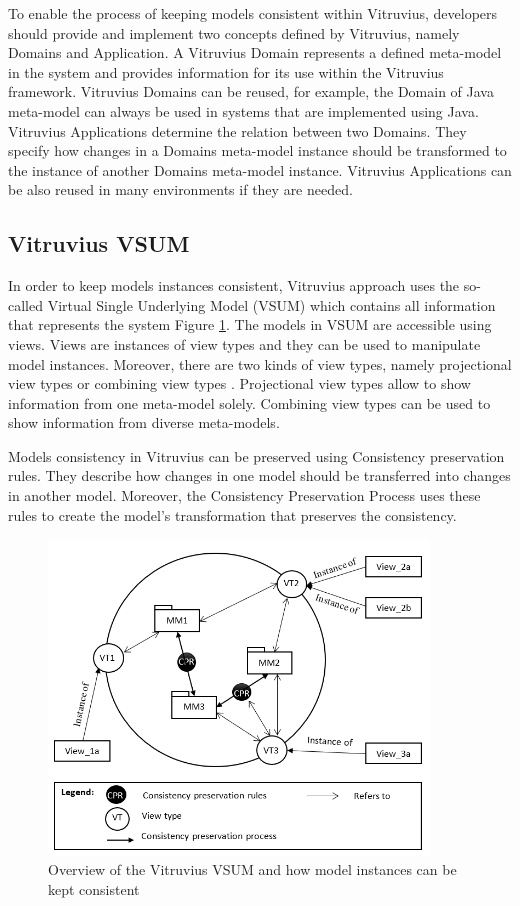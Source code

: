 To enable the process of keeping models consistent within Vitruvius, developers should provide and implement two concepts defined by Vitruvius, namely Domains and Application. A Vitruvius Domain represents a defined meta-model in the system and provides information for its use within the Vitruvius framework. Vitruvius Domains can be reused, for example, the Domain of Java meta-model can always be used in systems that are implemented using Java. Vitruvius Applications determine the relation between two Domains. They specify how changes in a Domains meta-model instance should be transformed to the instance of another Domains meta-model instance. Vitruvius Applications can be also reused in many environments if they are needed.

\subsection{Vitruvius VSUM}
\label{sec:Vitruvius VSUM}
In order to keep models instances consistent, Vitruvius approach uses the so-called Virtual Single Underlying Model (VSUM) which contains all information that represents the system Figure \ref{fig:vitruv_vsum}. The models in VSUM are accessible using views. Views are instances of view types and they can be used to manipulate model instances. Moreover, there are two kinds of view types, namely projectional view types or combining view types \cite{burger2013flexible}. Projectional view types allow to show information from one meta-model solely. Combining view types can be used to show information from diverse meta-models.

Models consistency in Vitruvius can be preserved using Consistency preservation rules. They describe how changes in one model should be transferred into changes in another model. Moreover, the Consistency Preservation Process uses these rules to create the model's transformation that preserves the consistency.


\begin{figure}[h]
\centering
\includegraphics[width=0.9\textwidth]{figures/vitruv_vsum}
\caption{Overview of the Vitruvius VSUM and how model instances can be kept consistent}
\label{fig:vitruv_vsum}
\end{figure}

